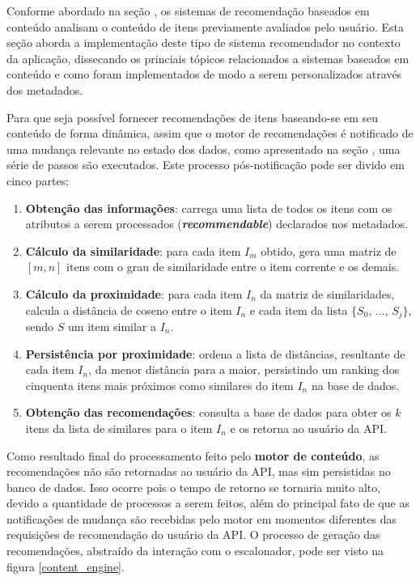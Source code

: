 \documentclass[12pt, openright, oneside, a4paper, brazil]{abntex2}
\begin{document}
Conforme abordado na seção , os sistemas de recomendação baseados em conteúdo analisam o conteúdo de itens previamente avaliados pelo usuário. Esta seção aborda a implementação deste tipo de sistema recomendador no contexto da aplicação, dissecando os princiais tópicos relacionados a sistemas baseados em conteúdo e como foram implementados de modo a serem personalizados através dos metadados.

Para que seja possível fornecer recomendações de itens baseando-se em seu conteúdo de forma dinâmica, assim que o motor de recomendações é notificado de uma mudança relevante no estado dos dados, como apresentado na seção , uma série de passos são executados. Este processo pós-notificação pode ser divido em cinco partes:

\begin{enumerate}
	\item \textbf{Obtenção das informações}: carrega uma lista de todos os itens com os atributos a serem processados (\textbf{\textit{recommendable}}) declarados nos metadados.

	\item \textbf{Cálculo da similaridade}: para cada item $I_{m}$ obtido, gera uma matriz de $[m, n]$ itens com o grau de similaridade entre o item corrente e os demais.

	\item \textbf{Cálculo da proximidade}: para cada item $I_n$ da matriz de similaridades, calcula a distância de coseno entre o item $I_n$ e cada item da lista $\lbrace S_{0}$, ..., $S_{j} \rbrace$, sendo $S$ um item similar a $I_{n}$.

	\item \textbf{Persistência por proximidade}: ordena a lista de distâncias, resultante de cada item $I_{n}$, da menor distância para a maior, persistindo um ranking dos cinquenta itens mais próximos como similares do item $I_{n}$ na base de dados.

	\item \textbf{Obtenção das recomendações}: consulta a base de dados para obter os $k$ itens da lista de similares para o item $I_{n}$ e os retorna ao usuário da API.
\end{enumerate}

Como resultado final do processamento feito pelo \textbf{motor de conteúdo}, as recomendações não são retornadas ao usuário da API, mas sim persistidas no banco de dados. Isso ocorre pois o tempo de retorno se tornaria muito alto, devido a quantidade de processos a serem feitos, além do principal fato de que as notificações de mudança são recebidas pelo motor em momentos diferentes das requisições de recomendação do usuário da API. O processo de geração das recomendações, abstraído da interação com o escalonador, pode ser visto na figura \ref{content_engine}. 
\end{document}
